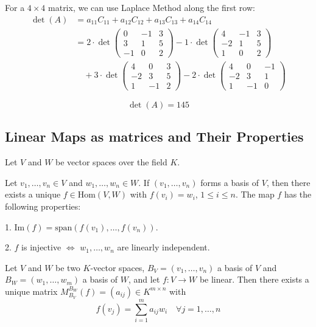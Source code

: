 For a $4 \times 4$ matrix, we can use Laplace Method along the first row:
\begin{align*}
\det(A) &= a_{11}C_{11} + a_{12}C_{12} + a_{13}C_{13} + a_{14}C_{14} \\
&= 2 \cdot \det\begin{pmatrix} 0 & -1 & 3 \\ 3 & 1 & 5 \\ -1 & 0 & 2 \end{pmatrix} 
- 1 \cdot \det\begin{pmatrix} 4 & -1 & 3 \\ -2 & 1 & 5 \\ 1 & 0 & 2 \end{pmatrix} \\
&\quad + 3 \cdot \det\begin{pmatrix} 4 & 0 & 3 \\ -2 & 3 & 5 \\ 1 & -1 & 2 \end{pmatrix} 
- 2 \cdot \det\begin{pmatrix} 4 & 0 & -1 \\ -2 & 3 & 1 \\ 1 & -1 & 0 \end{pmatrix}
\end{align*}

\[\det(A) = 145\]

\subsection{Linear Maps as matrices and Their Properties}

Let $V$ and $W$ be vector spaces over the field $K$.

\noindent Let $v_1, \dots, v_n \in V$ and $w_1, \dots, w_n \in W$. If $(v_1, \dots, v_n)$ forms a basis of $V$, then there exists a unique $f \in \text{Hom}(V, W)$ with $f(v_i) = w_i$, $1 \leq i \leq n$. The map $f$ has the following properties:

1.  $\text{Im}(f) = \text{span}(f(v_1), \dots, f(v_n))$.

2.  $f$ is injective $\Leftrightarrow$ $w_1, \dots, w_n$ are linearly independent.

\noindent Let $V$ and $W$ be two $K$-vector spaces, $B_V = (v_1, \dots, v_n)$ a basis of $V$ and $B_W = (w_1, \dots, w_m)$ a basis of $W$, and let $f : V \rightarrow W$ be linear. Then there exists a unique matrix $M_{B_V}^{B_W}(f) = (a_{ij}) \in K^{m \times n}$ with
\[
f(v_j) = \sum_{i=1}^{m} a_{ij}w_i \quad \forall j = 1, \dots, n
\]

